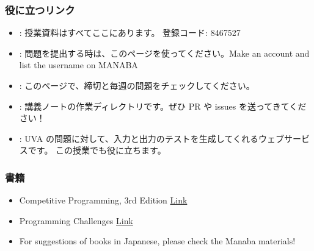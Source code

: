 \documentclass{beamer}
\begin{document}
\begin{frame}
  \frametitle{役に立つリンク}
  \begin{itemize} 
  \item
    \href{https://manaba.tsukuba.ac.jp/ct/course_781339}
         {}: 授業資料はすべてここにあります。
         登録コード: 8467527

    \medskip

  \item \href{https://uva.onlinejudge.org/}{}:
    問題を提出する時は、このページを使ってください。\alert{Make an account and list the username on MANABA}

    \medskip

  \item \href{https://conclave.cs.tsukuba.ac.jp/lecture/monitor.html}{}:
    このページで、締切と毎週の問題をチェックしてください。

    \medskip

  \item
    \href{https://www.github.com/caranha/ProgrammingChallengesLectureNotes}{}:
    講義ノートの作業ディレクトリです。ぜひ PR や issues を送ってきてください！

    \medskip
    
  \item
    \href{https://www.udebug.com/}{}:
    UVA の問題に対して、入力と出力のテストを生成してくれるウェブサービスです。
    この授業でも役に立ちます。
  \end{itemize}
\end{frame}


\begin{frame}
  \frametitle{書籍}

  \begin{itemize}
  \item {} Competitive Programming, 3rd Edition
    \href{http://cpbook.net/}{Link}
    
    \bigskip

  \item {} Programming Challenges
    \href{https://books.google.co.jp/books/about/Programming_Challenges.html?id=dNoLBwAAQBAJ&source=kp_cover&redir_esc=y}{Link}

    \bigskip
    
  \item For suggestions of books in Japanese, please check the Manaba materials!
  \end{itemize}
\end{frame}
\end{document}
